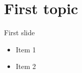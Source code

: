 
\section{First topic}

\begin{frame}{First slide}
	\begin{itemize}
		\item Item 1
		\item Item 2
	\end{itemize}
\end{frame}
